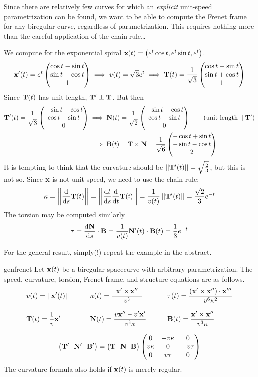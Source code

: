          

Since there are relatively few curves for which an \emph{explicit} unit-speed parametrization can be found, we want to be able to compute the Frenet frame for any biregular curve, regardless of parametrization. This requires nothing more than the careful application of the chain rule\ldots

\begin{example}{}{}
	We compute for the exponential spiral $\vx(t)=\bigl(e^t\cos t,e^t\sin t,e^t\bigr)$.
	\[
		\vx'(t) =e^t\threevec{\cos t-\sin t}{\sin t+\cos t}1 \implies v(t) =\sqrt 3e^t \implies \vT(t) =\frac{1}{\sqrt 3}\threevec{\cos t-\sin t}{\sin t+\cos t}1
	\]
	Since $\vT(t)$ has unit length, $\vT'\perp\vT$. But then
	\begin{align*}
		\vT'(t) =\frac 1{\sqrt 3}\threevec{-\sin t-\cos t}{\cos t-\sin t}0 
		&\implies \vN(t) =\frac 1{\sqrt 2}\threevec{-\sin t-\cos t}{\cos t-\sin t}0 \tag{unit length $\parallel\vT'$}\\
		&\implies\vB(t) =\vT\times\vN =\frac{1}{\sqrt 6}\threevec{-\cos t+\sin t}{-\sin t-\cos t}{2}
	\end{align*}
	It is tempting to think that the curvature should be $\Nm{\vT'(t)}=\sqrt{\frac 23}$, but this is not so. Since $\vx$ is not unit-speed, we need to use the chain rule:
	\[
		\kappa =\Nm{\diff s\vT(t)} =\Nm{\diff[t]{s}\diff t\vT(t)} =\frac 1{v(t)}\Nm{\vT'(t)} =\frac{\sqrt 2}3e^{-t}
	\]
	The torsion may be computed similarly
	\[
		\tau =\diff[\vN]{s}\cdot\vB =\frac 1{v(t)}\vN'(t)\cdot\vB(t) =\frac 13e^{-t}
	\]
\end{example}

For the general result, simply(!) repeat the example in the abstract.

\begin{cor}{}{genfrenet}
	Let $\vx(t)$ be a biregular spacecurve with arbitrary parametrization. The speed, curvature, torsion, Frenet frame, and structure equations are as follows.
	\begin{gather*}
		\begin{aligned}
			&v(t)=\Nm{\vx'(t)}\qquad
			&&\kappa(t)=\frac{\Nm{\vx'\times\vx''}}{v^3}\qquad
			&&\tau(t)=\frac{(\vx'\times\vx'')\cdot\vx'''}{v^6\kappa^2}\\[8pt]
			&\vT(t)=\frac 1v\vx'\qquad
			&&\vN(t)=\frac{v\vx''-v'\vx'}{v^3\kappa}\qquad
			&&\vB(t)=\frac{\vx'\times\vx''}{v^3\kappa}
		\end{aligned}\\[8pt]
		\bigl(\vT'\ \ \vN'\ \ \vB'\bigr)
		=
		\bigl(\vT\ \ \vN\ \ \vB\bigr)
		\begin{pmatrix}
			0&-v\kappa &0\\v\kappa&0&-v\tau\\0&v\tau&0
		\end{pmatrix}
	\end{gather*}
	The curvature formula also holds if $\vx(t)$ is merely regular.
\end{cor}





